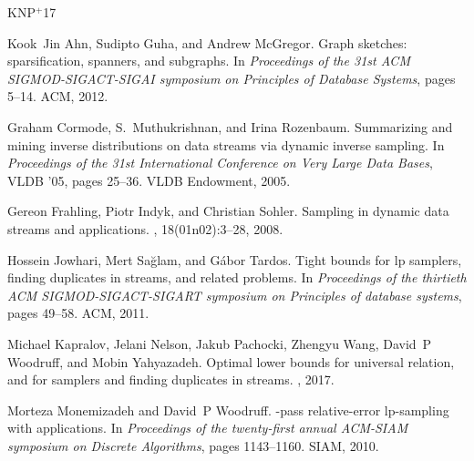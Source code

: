 \documentclass[11pt]{article}
\begin{document}
\nocite{*}

\newcommand{\etalchar}[1]{$^{#1}$}
\begin{thebibliography}{KNP{\etalchar{+}}17}

Kook~Jin Ahn, Sudipto Guha, and Andrew McGregor.
\newblock Graph sketches: sparsification, spanners, and subgraphs.
\newblock In {\em Proceedings of the 31st ACM SIGMOD-SIGACT-SIGAI symposium on
  Principles of Database Systems}, pages 5--14. ACM, 2012.

Graham Cormode, S.~Muthukrishnan, and Irina Rozenbaum.
\newblock Summarizing and mining inverse distributions on data streams via
  dynamic inverse sampling.
\newblock In {\em Proceedings of the 31st International Conference on Very
  Large Data Bases}, VLDB '05, pages 25--36. VLDB Endowment, 2005.

Gereon Frahling, Piotr Indyk, and Christian Sohler.
\newblock Sampling in dynamic data streams and applications.
, 18(01n02):3--28, 2008.

Hossein Jowhari, Mert Sa{\u{g}}lam, and G{\'a}bor Tardos.
\newblock Tight bounds for lp samplers, finding duplicates in streams, and
  related problems.
\newblock In {\em Proceedings of the thirtieth ACM SIGMOD-SIGACT-SIGART
  symposium on Principles of database systems}, pages 49--58. ACM, 2011.

\bibitem[KNP{\etalchar{+}}17]{kapralov2017optimal}
Michael Kapralov, Jelani Nelson, Jakub Pachocki, Zhengyu Wang, David~P
  Woodruff, and Mobin Yahyazadeh.
\newblock Optimal lower bounds for universal relation, and for samplers and
  finding duplicates in streams.
, 2017.

Morteza Monemizadeh and David~P Woodruff.
-pass relative-error lp-sampling with applications.
\newblock In {\em Proceedings of the twenty-first annual ACM-SIAM symposium on
  Discrete Algorithms}, pages 1143--1160. SIAM, 2010.

\end{thebibliography}
\end{document}

